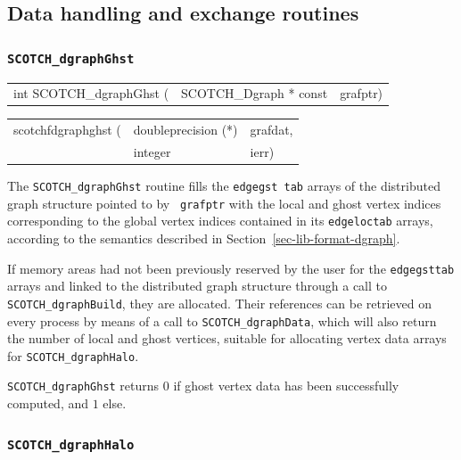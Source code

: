 \subsection{Data handling and exchange routines}

\subsubsection{{\tt SCOTCH\_dgraphGhst}}
\label{sec-lib-dgraphghst}

\begin{itemize}
\progsyn

{\tt\begin{tabular}{l@{}ll}

int SCOTCH\_dgraphGhst ( & SCOTCH\_Dgraph * const & grafptr)
\end{tabular}}

{\tt\begin{tabular}{l@{}ll}
scotchfdgraphghst ( & doubleprecision (*) & grafdat, \\
                    & integer             & ierr)
\end{tabular}}

\progdes

The {\tt SCOTCH\_dgraphGhst} routine fills the {\tt edge\lbt gst\lbt
tab} arrays of the distributed graph structure pointed to by {\tt
grafptr} with the local and ghost vertex indices corresponding to the
global vertex indices contained in its {\tt edge\lbt loc\lbt tab}
arrays, according to the semantics described in
Section~\ref{sec-lib-format-dgraph}.

If memory areas had not been previously reserved by the user for the
{\tt edge\lbt gst\lbt tab} arrays and linked to the distributed graph
structure through a call to {\tt SCOTCH\_\lbt dgraph\lbt Build}, they
are allocated. Their references can be retrieved on every process by
means of a call to {\tt SCOTCH\_\lbt dgraph\lbt Data}, which will also
return the number of local and ghost vertices, suitable for allocating
vertex data arrays for {\tt SCOTCH\_\lbt dgraph\lbt Halo}.

\progret

{\tt SCOTCH\_dgraphGhst} returns $0$ if ghost vertex data has been
successfully computed, and $1$ else.
\end{itemize}

\subsubsection{{\tt SCOTCH\_dgraphHalo}}
\label{sec-lib-dgraphhalo}

